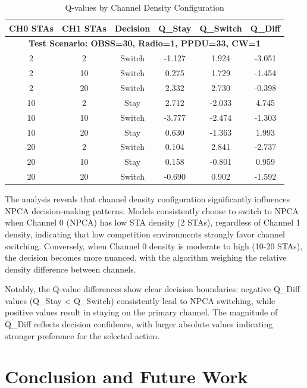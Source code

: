 \documentclass[conference]{IEEEtran}
\begin{document}
\begin{table}[]
\caption{Q-values by Channel Density Configuration}
\begin{center}
\begin{tabular}{|c|c|c|c|c|c|}
\hline
\textbf{CH0 STAs} & \textbf{CH1 STAs} & \textbf{Decision} & \textbf{Q\_Stay} & \textbf{Q\_Switch} & \textbf{Q\_Diff} \\
\hline
\multicolumn{6}{|c|}{\textbf{Test Scenario: OBSS=30, Radio=1, PPDU=33, CW=1}} \\
\hline
2 & 2 & Switch & -1.127 & 1.924 & -3.051 \\
2 & 10 & Switch & 0.275 & 1.729 & -1.454 \\
2 & 20 & Switch & 2.332 & 2.730 & -0.398 \\
10 & 2 & Stay & 2.712 & -2.033 & 4.745 \\
10 & 10 & Switch & -3.777 & -2.474 & -1.303 \\
10 & 20 & Stay & 0.630 & -1.363 & 1.993 \\
20 & 2 & Switch & 0.104 & 2.841 & -2.737 \\
20 & 10 & Stay & 0.158 & -0.801 & 0.959 \\
20 & 20 & Switch & -0.690 & 0.902 & -1.592 \\
\hline
\end{tabular}
\label{tab:density_qvalues}
\end{center}
\end{table}

The analysis reveals that channel density configuration significantly influences NPCA decision-making patterns. Models consistently choose to switch to NPCA when Channel 0 (NPCA) has low STA density (2 STAs), regardless of Channel 1 density, indicating that low competition environments strongly favor channel switching. Conversely, when Channel 0 density is moderate to high (10-20 STAs), the decision becomes more nuanced, with the algorithm weighing the relative density difference between channels.

Notably, the Q-value differences show clear decision boundaries: negative Q\_Diff values (Q\_Stay < Q\_Switch) consistently lead to NPCA switching, while positive values result in staying on the primary channel. The magnitude of Q\_Diff reflects decision confidence, with larger absolute values indicating stronger preference for the selected action.

\section{Conclusion and Future Work}
\end{document}
